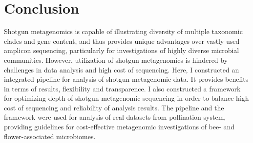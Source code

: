 \documentclass[11pt]{article}
\begin{document}
\section{Conclusion}
Shotgun metagenomics is capable of illustrating diversity of multiple taxonomic clades and gene content, and thus provides unique advantages over vastly used amplicon sequencing, particularly for investigations of highly diverse microbial communities. 
However, utilization of shotgun metagenomics is hindered by challenges in data analysis and high cost of sequencing. 
Here, I constructed an integrated pipeline for analysis of shotgun metagenomic data. 
It provides benefits in terms of results, flexibility and transparence. 
I also constructed a framework for optimizing depth of shotgun metagenomic sequencing in order to balance high cost of sequencing and reliability of analysis results. 
The pipeline and the framework were used for analysis of real datasets from pollination system, providing guidelines for cost-effective metagenomic investigations of bee- and flower-associated microbiomes.
\end{document}
